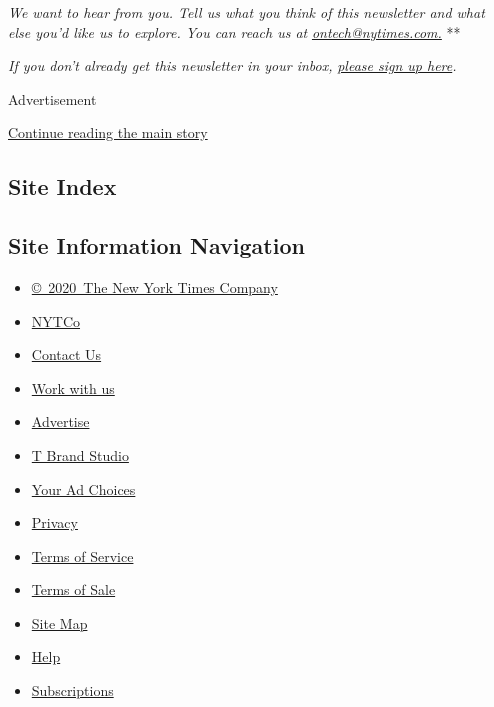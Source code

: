 \emph{We want to hear from you. Tell us what you think of this
newsletter and what else you'd like us to explore. You can reach us at}
\href{mailto:ontech@nytimes.com?subject=On\%20Tech\%20Feedback}{\emph{ontech@nytimes.com.}}
**

\emph{If you don't already get this newsletter in your inbox,}
\href{https://www.nytimes.com/newsletters/signup/OT}{\emph{please sign
up here}}\emph{.}

Advertisement

\protect\hyperlink{after-bottom}{Continue reading the main story}

\hypertarget{site-index}{%
\subsection{Site Index}\label{site-index}}

\hypertarget{site-information-navigation}{%
\subsection{Site Information
Navigation}\label{site-information-navigation}}

\begin{itemize}
\tightlist
\item
  \href{https://help.nytimes.com/hc/en-us/articles/115014792127-Copyright-notice}{©~2020~The
  New York Times Company}
\end{itemize}

\begin{itemize}
\tightlist
\item
  \href{https://www.nytco.com/}{NYTCo}
\item
  \href{https://help.nytimes.com/hc/en-us/articles/115015385887-Contact-Us}{Contact
  Us}
\item
  \href{https://www.nytco.com/careers/}{Work with us}
\item
  \href{https://nytmediakit.com/}{Advertise}
\item
  \href{http://www.tbrandstudio.com/}{T Brand Studio}
\item
  \href{https://www.nytimes.com/privacy/cookie-policy\#how-do-i-manage-trackers}{Your
  Ad Choices}
\item
  \href{https://www.nytimes.com/privacy}{Privacy}
\item
  \href{https://help.nytimes.com/hc/en-us/articles/115014893428-Terms-of-service}{Terms
  of Service}
\item
  \href{https://help.nytimes.com/hc/en-us/articles/115014893968-Terms-of-sale}{Terms
  of Sale}
\item
  \href{https://spiderbites.nytimes.com}{Site Map}
\item
  \href{https://help.nytimes.com/hc/en-us}{Help}
\item
  \href{https://www.nytimes.com/subscription?campaignId=37WXW}{Subscriptions}
\end{itemize}
